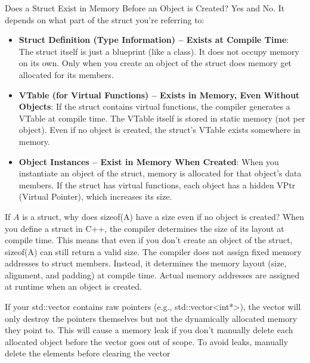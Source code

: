\documentclass{report}
\begin{document}
    \pagebreak 
    \bigbreak \noindent 
    Does a Struct Exist in Memory Before an Object is Created? Yes and No. It depends on what part of the struct you're referring to:
    \begin{itemize}
        \item \textbf{Struct Definition (Type Information) – Exists at Compile Time}: The struct itself is just a blueprint (like a class). It does not occupy memory on its own.
            \bigbreak \noindent 
            Only when you create an object of the struct does memory get allocated for its members.
        \item \textbf{VTable (for Virtual Functions) – Exists in Memory, Even Without Objects}: If the struct contains virtual functions, the compiler generates a VTable at compile time. The VTable itself is stored in static memory (not per object). Even if no object is created, the struct’s VTable exists somewhere in memory.
        \item \textbf{Object Instances – Exist in Memory When Created}: When you instantiate an object of the struct, memory is allocated for that object’s data members. If the struct has virtual functions, each object has a hidden VPtr (Virtual Pointer), which increases its size.
    \end{itemize}
    \bigbreak \noindent 
    If $A$ is a struct, why does sizeof(A) have a size even if no object is created? When you define a struct in C++, the compiler determines the size of its layout at compile time. This means that even if you don’t create an object of the struct, sizeof(A) can still return a valid size.
    \bigbreak \noindent 
    The compiler does not assign fixed memory addresses to struct members. Instead, it determines the memory layout (size, alignment, and padding) at compile time. Actual memory addresses are assigned at runtime when an object is created.







    \pagebreak 
    \bigbreak \noindent 
    If your std::vector contains raw pointers (e.g., std::vector<int*>), the vector will only destroy the pointers themselves but not the dynamically allocated memory they point to. This will cause a memory leak if you don’t manually delete each allocated object before the vector goes out of scope.
    \bigbreak \noindent 
    To avoid leaks, manually delete the elements before clearing the vector
\end{document}
